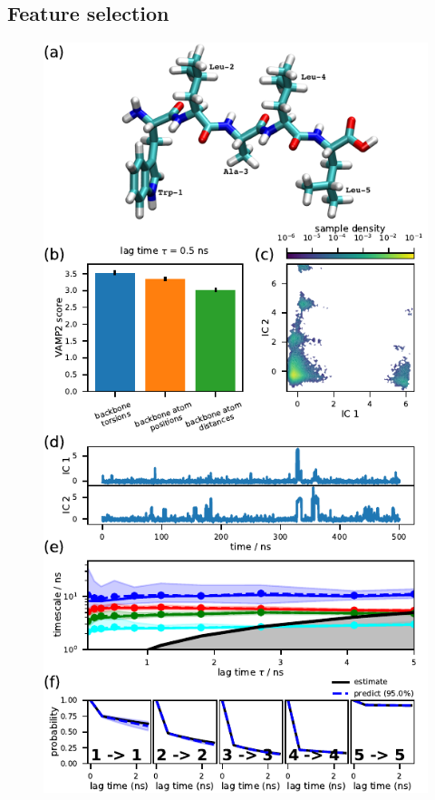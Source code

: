 \documentclass[9pt,tutorial]{livecoms}
\begin{document}
\subsection{Feature selection}

\begin{figure}
\includegraphics{figure_2}

\end{figure}
\end{document}
